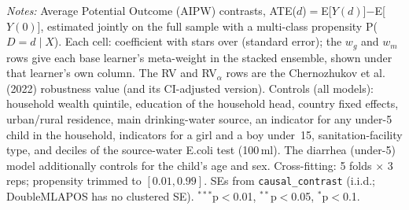 \begin{landscape}
\begin{table}[htbp]
\begin{minipage}{\linewidth}\footnotesize \textit{Notes:} Average Potential Outcome (AIPW) contrasts, ATE($d$)$=$E[$Y(d)$]$-$E[$Y(0)$], estimated jointly on the full sample with a multi-class propensity P($D{=}d\mid X$). Each cell: coefficient with stars over (standard error); the $w_g$ and $w_m$ rows give each base learner's meta-weight in the stacked ensemble, shown under that learner's own column. The RV and RV$_\alpha$ rows are the Chernozhukov et al. (2022) robustness value (and its CI-adjusted version). Controls (all models): household wealth quintile, education of the household head, country fixed effects, urban/rural residence, main drinking-water source, an indicator for any under-5 child in the household, indicators for a girl and a boy under~15, sanitation-facility type, and deciles of the source-water E.coli test (100\,ml). The diarrhea (under-5) model additionally controls for the child's age and sex. Cross-fitting: 5 folds $\times$ 3 reps; propensity trimmed to $[0.01,0.99]$. SEs from \texttt{causal\_contrast} (i.i.d.; DoubleMLAPOS has no clustered SE). $^{***}$p$<$0.01, $^{**}$p$<$0.05, $^{*}$p$<$0.1.\end{minipage}
\end{table}
\end{landscape}